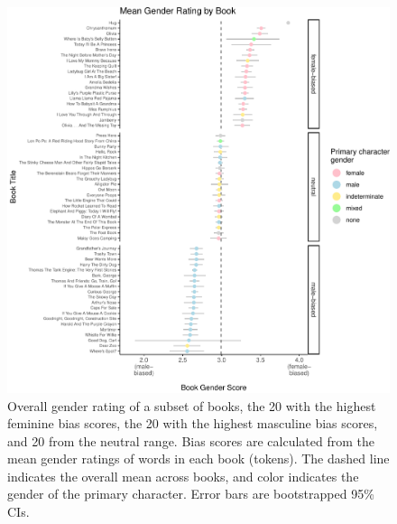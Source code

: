 \documentclass[
  english,
  ,man,floatsintext]{apa6}
\begin{document}
\begin{figure}[b]
\includegraphics{figs/fig1.pdf} \caption{Overall gender rating of  a subset of books, the 20 with the highest feminine bias scores, the 20 with the highest masculine bias scores, and 20 from the neutral range. Bias scores are calculated from the mean gender ratings of words in each book (tokens). The dashed line indicates the overall mean across books, and color indicates the gender of the primary character. Error bars are bootstrapped 95\% CIs.}\label{fig:bookforest}
\end{figure}
\end{document}
